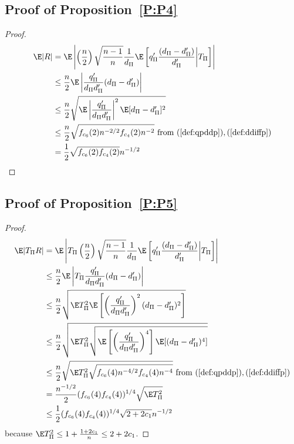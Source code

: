 \subsection{Proof of Proposition~\ref{P:P4}}
\begin{proof}
  \begin{align*}
    \E|R| &= \E \left | \left (\frac{n}{2}\right )
      \sqrt{\frac{n-1}{n}}\frac{1}{d_{\Pi}}\E
      \left [q_{\Pi}'\frac{(d_{\Pi}-d_{\Pi}')}{d_{\Pi}'} \middle | T_{\Pi} \right ]\right | \\
    &\leq \frac{n}{2} \E \left | \frac{q_{\Pi}'}{d_{\Pi}d_{\Pi}'}(d_{\Pi}-d_{\Pi}') \right | \\
    &\leq \frac{n}{2} \sqrt{\E \left | \frac{q_{\Pi}'}{d_{\Pi}d_{\Pi}'} \right |^2
      \E[d_{\Pi}-d_{\Pi}']^2} \\
    &\leq \frac{n}{2} \sqrt{f_{c_6}(2) n^{-2/2} f_{c_4}(2) n^{-2}}
    \text{ from } (\ref{def:qpddp}), (\ref{def:ddiffp}) \\
    &=\frac{1}{2}\sqrt{f_{c_6}(2)f_{c_4}(2)} n^{-1/2}
  \end{align*}
\end{proof}

\subsection{Proof of Proposition~\ref{P:P5}}
\begin{proof}
  \begin{align*}
    \E|T_{\Pi}R| &= \E \left | T_{\Pi} \left (\frac{n}{2}\right )
      \sqrt{\frac{n-1}{n}}\frac{1}{d_{\Pi}}\E
      \left [q_{\Pi}'\frac{(d_{\Pi}-d_{\Pi}')}{d_{\Pi}'} \middle | T_{\Pi} \right ]\right | \\
    &\leq \frac{n}{2} \E \left |T_{\Pi} \frac{q_{\Pi}'}{d_{\Pi}d_{\Pi}'}(d_{\Pi}-d_{\Pi}') \right | \\
    &\leq \frac{n}{2} \sqrt{\E T_{\Pi}^2 \E \left [ \left ( \frac{q_{\Pi}'}{d_{\Pi}d_{\Pi}'} \right )^2
        (d_{\Pi}-d_{\Pi}')^2 \right ] } \\
    &\leq \frac{n}{2} \sqrt{\E T_{\Pi}^2 \sqrt{\E \left [ \left ( \frac{q_{\Pi}'}{d_{\Pi}d_{\Pi}'}
          \right )^4 \right ] \E[(d_{\Pi}-d_{\Pi}')^4] }} \\
    &\leq \frac{n}{2} \sqrt{\E T_{\Pi}^2 \sqrt{f_{c_6}(4) n^{-4/2} f_{c_4}(4) n^{-4}}}
    \text{ from } (\ref{def:qpddp}), (\ref{def:ddiffp}) \\
    &=\frac{n^{-1/2}}{2}(f_{c_6}(4)f_{c_4}(4))^{1/4}\sqrt{\E T_{\Pi}^2} \\
    &\leq \frac{1}{2}(f_{c_6}(4)f_{c_4}(4))^{1/4} \sqrt{2+2c_1} n^{-1/2}
  \end{align*}
  because $\E T_{\Pi}^2 \leq 1 + \frac{1+2c_1}{n} \leq 2 + 2c_1$.
\end{proof}
